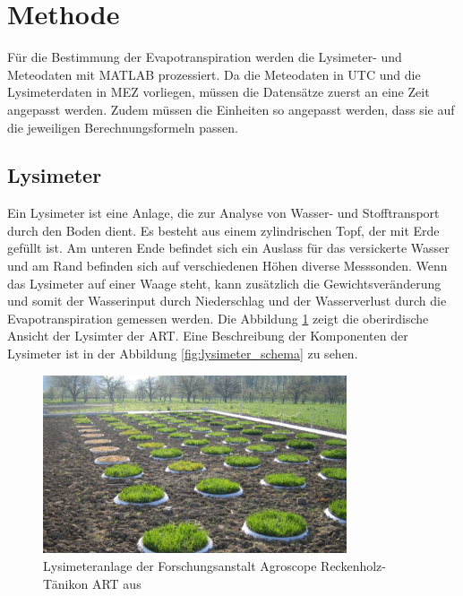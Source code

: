 \section{Methode}
Für die Bestimmung der Evapotranspiration werden die Lysimeter- und Meteodaten mit MATLAB prozessiert. Da die Meteodaten in UTC und die Lysimeterdaten in MEZ vorliegen, müssen die Datensätze zuerst an eine Zeit angepasst werden. Zudem müssen die Einheiten so angepasst werden, dass sie auf die jeweiligen Berechnungsformeln passen.
\subsection {Lysimeter}

Ein Lysimeter ist eine Anlage, die zur Analyse von Wasser- und Stofftransport durch den Boden dient. Es besteht aus einem zylindrischen Topf, der mit Erde gefüllt ist. Am unteren Ende befindet sich ein Auslass für das versickerte Wasser und am Rand befinden sich auf verschiedenen Höhen diverse Messsonden. Wenn das Lysimeter auf einer Waage steht, kann zusätzlich die Gewichtsveränderung und somit der Wasserinput durch Niederschlag und der Wasserverlust durch die Evapotranspiration gemessen werden. Die Abbildung \ref{fig:lysimeter_ART}  zeigt die oberirdische Ansicht der Lysimter der ART. Eine Beschreibung der Komponenten der Lysimeter ist in der Abbildung \ref{fig:lysimeter_schema} zu sehen.\\

\begin{figure}[H]
\centering
\includegraphics[width=0.8\textwidth]{figures/lysimeter_ART.jpg}
\caption{Lysimeteranlage der Forschungsanstalt Agroscope Reckenholz-Tänikon ART aus \cite{art}}
\label{fig:lysimeter_ART}
\end{figure}
 

